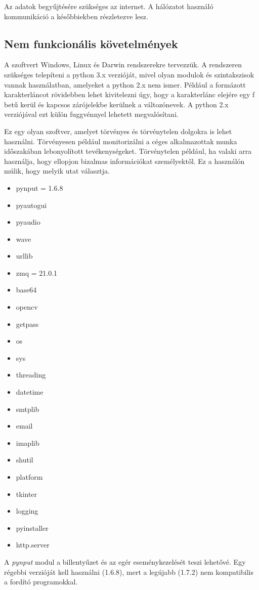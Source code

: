\documentclass[12pt,a4paper,oneside]{report}
\begin{document}
Az adatok begyűjtésére szükséges az internet. A hálózatot használó kommunikáció a későbbiekben részletezve lesz.

\subsection{Nem funkcionális követelmények}
A szoftvert Windows, Linux és Darwin rendszerekre tervezzük. A rendszeren szükséges telepíteni a python 3.x verzióját, mivel olyan modulok és szintakszisok vannak használatban, amelyeket a python 2.x nem ismer. Például a formázott karakterláncot rövidebben lehet kivitelezni úgy, hogy a karakterlánc elejére egy f betű kerül és kapcsos zárójelekbe kerülnek a változónevek. A python 2.x verziójával ezt külön fuggvénnyel lehetett megvalósítani.

Ez egy olyan szoftver, amelyet törvényes és törvénytelen dolgokra is lehet használni. Törvényesen például monitorizálni a céges alkalmazottak munka időszakában lebonyolított tevékenységeket. Törvénytelen például, ha valaki arra használja, hogy ellopjon bizalmas információkat személyektől. Ez a használón múlik, hogy melyik utat választja.

\begin{multicols}{2}
\begin{itemize}
\item pynput = 1.6.8
\item pyautogui
\item pyaudio
\item wave
\item urllib
\item zmq = 21.0.1
\item base64
\item opencv
\item getpass
\item os
\item sys
\item threading
\item datetime
\item smtplib
\item email
\item imaplib
\item shutil
\item platform
\item tkinter
\item logging
\item pyinstaller
\item http.server
\end{itemize}
\end{multicols}
A \emph{pynput} modul a billentyűzet és az egér eseménykezelését teszi lehetővé. Egy régebbi verzióját kell használni (1.6.8), mert a legújabb (1.7.2) nem kompatibilis a fordító programokkal.
\end{document}
